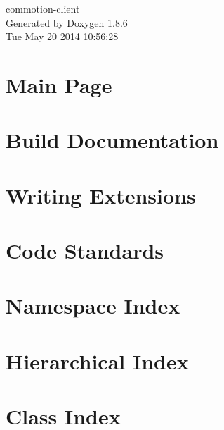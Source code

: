 \documentclass[twoside]{book}
\newcommand{\clearemptydoublepage}{%
  \newpage{\pagestyle{empty}\cleardoublepage}%
}
\begin{document}
\hypersetup{pageanchor=false}
\begin{titlepage}
\vspace*{7cm}
\begin{center}%
{\Large commotion-\/client }\\
\vspace*{1cm}
{\large Generated by Doxygen 1.8.6}\\
\vspace*{0.5cm}
{\small Tue May 20 2014 10:56:28}\\
\end{center}
\end{titlepage}
\clearemptydoublepage
\tableofcontents
\clearemptydoublepage
{}
\hypersetup{pageanchor=true}

\chapter{Main Page}
\label{index}\hypertarget{index}{}
\chapter{Build Documentation}
\label{md_build_README}
\hypertarget{md_build_README}{}

\chapter{Writing Extensions}
\label{md_docs_extensions_writing_extensions}
\hypertarget{md_docs_extensions_writing_extensions}{}

\chapter{Code Standards}
\label{md_docs_style_standards_README}
\hypertarget{md_docs_style_standards_README}{}

\chapter{Namespace Index}

\chapter{Hierarchical Index}

\chapter{Class Index}

\end{document}
